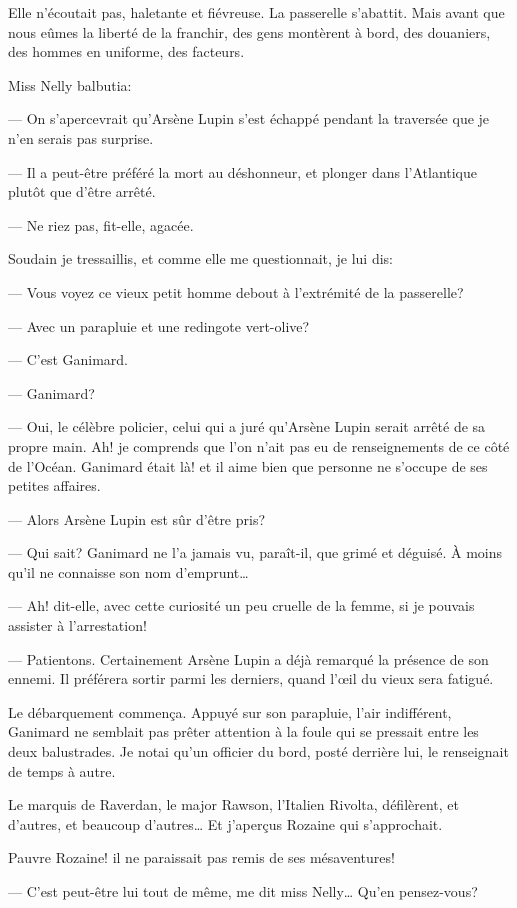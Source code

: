 \documentclass[12pt,a4paper]{article}
\begin{document}
Elle n’écoutait pas, haletante et fiévreuse. La passerelle s’abattit. Mais avant que nous eûmes la liberté de la franchir, des gens montèrent à bord, des douaniers, des hommes en uniforme, des facteurs. 

Miss Nelly balbutia:

— On s’apercevrait qu’Arsène Lupin s’est échappé pendant la traversée que je n’en serais pas surprise.

— Il a peut-être préféré la mort au déshonneur, et plonger dans l’Atlantique plutôt que d’être arrêté.

— Ne riez pas, fit-elle, agacée.

Soudain je tressaillis, et comme elle me questionnait, je lui dis:

— Vous voyez ce vieux petit homme debout à l’extrémité de la passerelle?

— Avec un parapluie et une redingote vert-olive?

— C’est Ganimard.

— Ganimard?

— Oui, le célèbre policier, celui qui a juré qu’Arsène Lupin serait arrêté de sa propre main. Ah! je comprends que l’on n’ait pas eu de renseignements de ce côté de l’Océan. Ganimard était là! et il aime bien que personne ne s’occupe de ses petites affaires.

— Alors Arsène Lupin est sûr d’être pris?

— Qui sait? Ganimard ne l’a jamais vu, paraît-il, que grimé et déguisé. À moins qu’il ne connaisse son nom d’emprunt…

— Ah! dit-elle, avec cette curiosité un peu cruelle de la femme, si je pouvais assister à l’arrestation! 

— Patientons. Certainement Arsène Lupin a déjà remarqué la présence de son ennemi. Il préférera sortir parmi les derniers, quand l’œil du vieux sera fatigué.

Le débarquement commença. Appuyé sur son parapluie, l’air indifférent, Ganimard ne semblait pas prêter attention à la foule qui se pressait entre les deux balustrades. Je notai qu’un officier du bord, posté derrière lui, le renseignait de temps à autre.

Le marquis de Raverdan, le major Rawson, l’Italien Rivolta, défilèrent, et d’autres, et beaucoup d’autres… Et j’aperçus Rozaine qui s’approchait.

Pauvre Rozaine! il ne paraissait pas remis de ses mésaventures!

— C’est peut-être lui tout de même, me dit miss Nelly… Qu’en pensez-vous?
\end{document}

